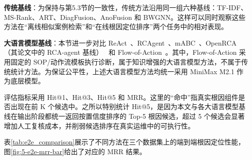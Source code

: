 \textbf{传统基线}：为保持与第5.3节的一致性，传统方法沿用同一组六种基线：TF-IDF、MS-Rank、ART、DiagFusion、AnoFusion 和 BWGNN。这样可以同时观察这些方法在“离线相似案例检索”和“在线根因定位排序”两个任务中的相对表现。

\textbf{大语言模型基线}：本节进一步对比 ReAct~\cite{yao2022react}、RCAgent~\cite{wang2024rcagent}、mABC~\cite{zhang2024mabc}、OpenRCA（其论文中的 RCA-agent 基线）~\cite{xu2025openrca} 和 Flow-of-Action~\cite{pei2025flowofaction}。其中，Flow-of-Action 采用固定的 SOP/动作流模板执行诊断，属于知识增强的大语言模型方法，不属于传统统计方法。为保证公平性，上述大语言模型方法均统一采用 MiniMax M2.1 作为底层模型。

评估指标采用 Hit@1、Hit@3、Hit@5 和 MRR。这里的“命中”指真实根因组件是否出现在前 K 个候选中。之所以特别统计 Hit@5，是因为本文与各大语言模型基线在输出阶段都统一返回按置信度排序的 Top-5 根因候选，超过 5 个候选会显著增加人工复核成本，并削弱候选排序在真实运维中的可执行性。

表\ref{tab:e2e_comparison}展示了不同方法在三个数据集上的端到端根因定位性能，图\ref{fig:5-e2e-mrr-bar}给出了对应的 MRR 结果。

